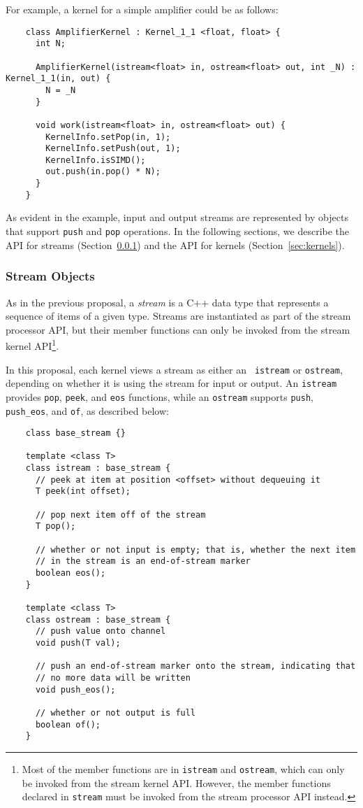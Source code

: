For example, a kernel for a simple amplifier could be as follows:
{\small
\begin{verbatim}
    class AmplifierKernel : Kernel_1_1 <float, float> {
      int N;

      AmplifierKernel(istream<float> in, ostream<float> out, int _N) : Kernel_1_1(in, out) {
        N = _N
      }

      void work(istream<float> in, ostream<float> out) {
        KernelInfo.setPop(in, 1);
        KernelInfo.setPush(out, 1);
        KernelInfo.isSIMD();
        out.push(in.pop() * N);
      }
    }  
\end{verbatim}}
As evident in the example, input and output streams are represented by
objects that support {\tt push} and {\tt pop} operations.  In the
following sections, we describe the API for streams
(Section~\ref{sec:kerstreams}) and the API for kernels
(Section~\ref{sec:kernels}).

\subsubsection{Stream Objects}
\label{sec:kerstreams}

As in the previous proposal, a {\it stream} is a C++ data type that
represents a sequence of items of a given type.  Streams are
instantiated as part of the stream processor API, but their member
functions can only be invoked from the stream kernel API\footnote{Most
of the member functions are in {\tt istream} and {\tt ostream}, which
can only be invoked from the stream kernel API.  However, the member
functions declared in {\tt stream} must be invoked from the stream
processor API instead.}.

In this proposal, each kernel views a stream as either an {\tt
istream} or {\tt ostream}, depending on whether it is using the stream
for input or output.  An {\tt istream} provides {\tt pop}, {\tt peek},
and {\tt eos} functions, while an {\tt ostream} supports {\tt push},
{\tt push\_eos}, and {\tt of}, as described below:
{\small
\begin{verbatim}
    class base_stream {}

    template <class T>
    class istream : base_stream {
      // peek at item at position <offset> without dequeuing it
      T peek(int offset);

      // pop next item off of the stream
      T pop();

      // whether or not input is empty; that is, whether the next item
      // in the stream is an end-of-stream marker
      boolean eos();
    }

    template <class T>
    class ostream : base_stream {
      // push value onto channel
      void push(T val);

      // push an end-of-stream marker onto the stream, indicating that
      // no more data will be written
      void push_eos();

      // whether or not output is full
      boolean of();
    }  
\end{verbatim}}

